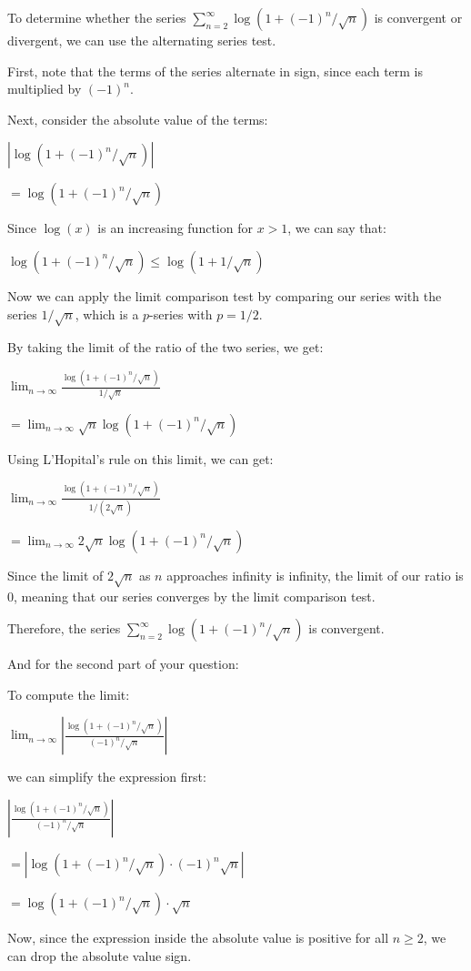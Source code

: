 \documentclass[12pt]{memoir}
\begin{document}
\begin{ptcb}
To determine whether the series $\sum_{n=2}^{\infty} \log(1+(-1)^n/\sqrt{n})$ is convergent or divergent, we can use the alternating series test.

First, note that the terms of the series alternate in sign, since each term is multiplied by $(-1)^n$.

Next, consider the absolute value of the terms:

$|\log(1+(-1)^n/\sqrt{n})|$

$= \log(1+(-1)^n/\sqrt{n})$

Since $\log(x)$ is an increasing function for $x > 1$, we can say that:

$\log(1+(-1)^n/\sqrt{n}) \leq \log(1+1/\sqrt{n})$

Now we can apply the limit comparison test by comparing our series with the series $1/\sqrt{n}$, which is a $p$-series with $p=1/2$.

By taking the limit of the ratio of the two series, we get:

$\lim_{n \to \infty} \frac{\log(1+(-1)^n/\sqrt{n})}{1/\sqrt{n}}$

$= \lim_{n \to \infty} \sqrt{n} \log(1+(-1)^n/\sqrt{n})$

Using L'Hopital's rule on this limit, we can get:

$\lim_{n \to \infty} \frac{\log(1+(-1)^n/\sqrt{n})}{1/(2\sqrt{n})}$

$= \lim_{n \to \infty} 2\sqrt{n} \log(1+(-1)^n/\sqrt{n})$

Since the limit of $2\sqrt{n}$ as $n$ approaches infinity is infinity, the limit of our ratio is 0, meaning that our series converges by the limit comparison test.

Therefore, the series $\sum_{n=2}^{\infty} \log(1+(-1)^n/\sqrt{n})$ is convergent.

And for the second part of your question:

To compute the limit:

$\lim_{n \to \infty} \left| \frac{\log(1+(-1)^n/\sqrt{n})}{(-1)^n/\sqrt{n}} \right|$

we can simplify the expression first:

$\left|\frac{\log(1+(-1)^n/\sqrt{n})}{(-1)^n/\sqrt{n}}\right|$

$= \left|\log(1+(-1)^n/\sqrt{n}) \cdot (-1)^n \sqrt{n}\right|$

$= \log(1+(-1)^n/\sqrt{n}) \cdot \sqrt{n}$

Now, since the expression inside the absolute value is positive for all $n \geq 2$, we can drop the absolute value sign.


\end{ptcb}
\end{document}
